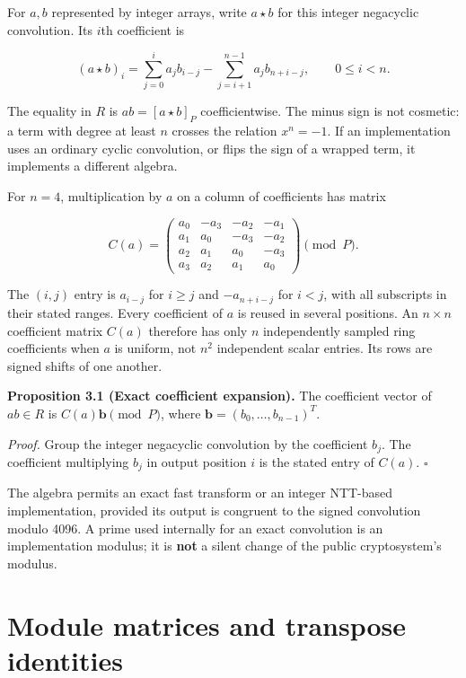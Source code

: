 \documentclass[
  11pt,
  a4paper,
  oneside]{report}
\begin{document}
For \(a,b\) represented by integer arrays, write \(a\star b\) for this
integer negacyclic convolution. Its \(i\)th coefficient is

\[
(a\star b)_i=
\sum_{j=0}^{i}a_jb_{i-j}
-\sum_{j=i+1}^{n-1}a_jb_{n+i-j},
\qquad 0\le i<n.
\]

The equality in \(R\) is \(ab=[a\star b]_P\) coefficientwise. The minus
sign is not cosmetic: a term with degree at least \(n\) crosses the
relation \(x^n=-1\). If an implementation uses an ordinary cyclic
convolution, or flips the sign of a wrapped term, it implements a
different algebra.

For \(n=4\), multiplication by \(a\) on a column of coefficients has
matrix

\[
C(a)=\begin{pmatrix}
a_0&-a_3&-a_2&-a_1\\
a_1&a_0&-a_3&-a_2\\
a_2&a_1&a_0&-a_3\\
a_3&a_2&a_1&a_0
\end{pmatrix}\pmod P.
\]

The \((i,j)\) entry is \(a_{i-j}\) for \(i\ge j\) and \(-a_{n+i-j}\) for
\(i<j\), with all subscripts in their stated ranges. Every coefficient
of \(a\) is reused in several positions. An \(n\times n\) coefficient
matrix \(C(a)\) therefore has only \(n\) independently sampled ring
coefficients when \(a\) is uniform, not \(n^2\) independent scalar
entries. Its rows are signed shifts of one another.

\textbf{Proposition 3.1 (Exact coefficient expansion).} The coefficient
vector of \(ab\in R\) is \(C(a)\mathbf b\pmod P\), where
\(\mathbf b=(b_0,\ldots,b_{n-1})^T\).

\emph{Proof.} Group the integer negacyclic convolution by the
coefficient \(b_j\). The coefficient multiplying \(b_j\) in output
position \(i\) is the stated entry of \(C(a)\). \(\square\)

The algebra permits an exact fast transform or an integer NTT-based
implementation, provided its output is congruent to the signed
convolution modulo 4096. A prime used internally for an exact
convolution is an implementation modulus; it is \textbf{not} a silent
change of the public cryptosystem's modulus.

\section{Module matrices and transpose
identities}\label{module-matrices-and-transpose-identities}
\end{document}
